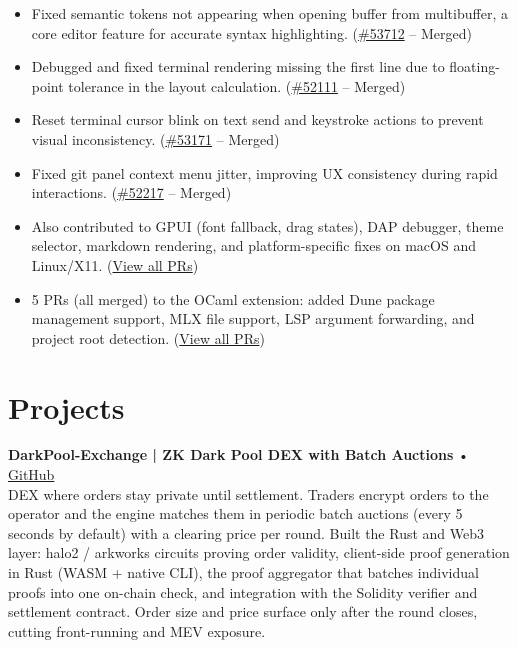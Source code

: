 \documentclass[10pt,a4paper]{article}
\begin{document}
\begin{itemize}
    \item {\footnotesize Fixed semantic tokens not appearing when opening buffer from multibuffer, a core editor feature for accurate syntax highlighting. (\href{https://github.com/zed-industries/zed/pull/53712}{\#53712} -- Merged)}
    \item {\footnotesize Debugged and fixed terminal rendering missing the first line due to floating-point tolerance in the layout calculation. (\href{https://github.com/zed-industries/zed/pull/52111}{\#52111} -- Merged)}
    \item {\footnotesize Reset terminal cursor blink on text send and keystroke actions to prevent visual inconsistency. (\href{https://github.com/zed-industries/zed/pull/53171}{\#53171} -- Merged)}
    \item {\footnotesize Fixed git panel context menu jitter, improving UX consistency during rapid interactions. (\href{https://github.com/zed-industries/zed/pull/52217}{\#52217} -- Merged)}
    \item {\footnotesize Also contributed to GPUI (font fallback, drag states), DAP debugger, theme selector, markdown rendering, and platform-specific fixes on macOS and Linux/X11. (\href{https://github.com/zed-industries/zed/pulls?q=author\%3ADnreikronos}{View all PRs})}
    \item {\footnotesize 5 PRs (all merged) to the OCaml extension: added Dune package management support, MLX file support, LSP argument forwarding, and project root detection. (\href{https://github.com/zed-extensions/ocaml/pulls?q=author\%3ADnreikronos}{View all PRs})}
\end{itemize}

\section{Projects}

\vspace{2pt}
\noindent\textbf{\footnotesize DarkPool-Exchange | ZK Dark Pool DEX with Batch Auctions} • {\footnotesize\href{https://github.com/Dnreikronos/DarkPool-Exchange}{GitHub}}\\
{\footnotesize DEX where orders stay private until settlement. Traders encrypt orders to the operator and the engine matches them in periodic batch auctions (every 5 seconds by default) with a clearing price per round. Built the Rust and Web3 layer: halo2 / arkworks circuits proving order validity, client-side proof generation in Rust (WASM + native CLI), the proof aggregator that batches individual proofs into one on-chain check, and integration with the Solidity verifier and settlement contract. Order size and price surface only after the round closes, cutting front-running and MEV exposure.}
\end{document}
